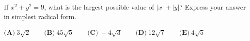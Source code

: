 If $x^2+y^2=9$, what is the largest possible value of $|x|+|y|$? Express your answer in simplest radical form.

$\textbf{(A)}~3\sqrt{2}\qquad\textbf{(B)}~45\sqrt{5}\qquad\textbf{(C)}~-4\sqrt{3}\qquad\textbf{(D)}~12\sqrt{7}\qquad\textbf{(E)}~4\sqrt{5}\qquad$
